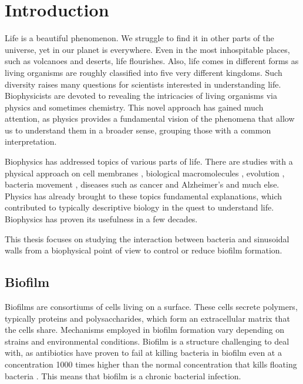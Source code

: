 \chapter{Introduction}

Life is a beautiful phenomenon. We struggle to find it in other parts of the universe, yet in our planet is everywhere. Even in the most inhospitable places, such as volcanoes and deserts, life flourishes. Also, life comes in different forms as living organisms are roughly classified into five very different kingdoms. Such diversity raises many questions for scientists interested in understanding life. Biophysicists are devoted to revealing the intricacies of living organisms via physics and sometimes chemistry. This novel approach has gained much attention, as physics provides a fundamental vision of the phenomena that allow us to understand them in a broader sense, grouping those with a common interpretation.

Biophysics has addressed topics of various parts of life. There are studies with a physical approach on cell membranes \cite{Nguyen2021PhotocatalyticSynthesis,Jin2020MechanosensitiveMechanisms,Janmey2006BiophysicalMembranes}, biological macromolecules \cite{Allewell2013MolecularSciences, 2008MethodsFunction, Fierz2019BiophysicsDynamics}, evolution \cite{Sikosek2014BiophysicsBiophysics}, bacteria movement \cite{Lauga2020TheMotility, Ananthakrishnan2007TheMovement}, diseases such as cancer and Alzheimer's \cite{White2019TheCancer, Weickenmeier2019ASclerosis} and much else. Physics has already brought to these topics fundamental explanations, which contributed to typically descriptive biology in the quest to understand life. Biophysics has proven its usefulness in a few decades.

This thesis focuses on studying the interaction between bacteria and sinusoidal walls from a biophysical point of view to control or reduce biofilm formation.

\section{Biofilm}

Biofilms are consortiums of cells living on a surface. These cells secrete polymers, typically proteins and polysaccharides, which form an extracellular matrix that the cells share. Mechanisms employed in biofilm formation vary depending on strains and environmental conditions. Biofilm is a structure challenging to deal with, as antibiotics have proven to fail at killing bacteria in biofilm even at a concentration 1000 times higher than the normal concentration that kills floating bacteria \cite{Costerton1987BacterialDisease.}. This means that biofilm is a chronic bacterial infection.

